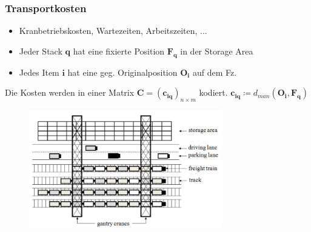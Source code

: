 \documentclass{beamer}
\begin{document}
\begin{frame}
\frametitle{Transportkosten}

\begin{itemize}
  \item Kranbetriebskosten, Wartezeiten, Arbeitszeiten, ...
  \item Jeder Stack $\boldsymbol{q}$ hat eine fixierte Position $\boldsymbol{F_q}$ in der Storage Area
  \item Jedes Item $\boldsymbol{i}$ hat eine geg. Originalposition $\boldsymbol{O_i}$ auf dem Fz.
\end{itemize}

Die Kosten werden in einer Matrix $\boldsymbol{C} = (\boldsymbol{c_{iq}})_{n \times m}$ kodiert.\newline
$\boldsymbol{c_{iq}} \coloneqq d_{man}(\boldsymbol{O_i}, \boldsymbol{F_q})$

\begin{figure}[H]
\centering
\includegraphics[width=0.75\textwidth]{images/costs.png}\newline
\end{figure}

\end{frame}
\end{document}
